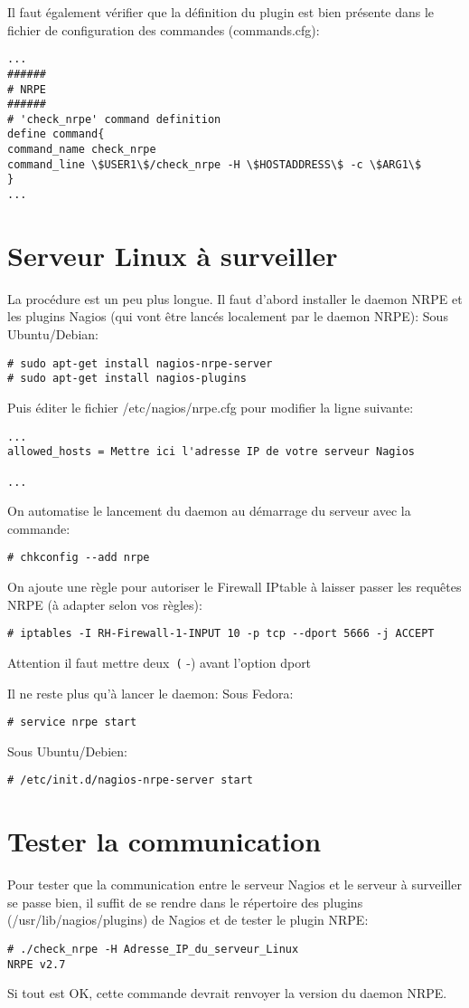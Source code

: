 Il faut également vérifier que la définition du plugin est bien présente dans le fichier de configuration des commandes (commands.cfg):
\begin{verbatim}
...
######
# NRPE
######
# 'check_nrpe' command definition
define command{
command_name check_nrpe
command_line \$USER1\$/check_nrpe -H \$HOSTADDRESS\$ -c \$ARG1\$
}
...
\end{verbatim}


\section {Serveur Linux à surveiller}

La procédure est un peu plus longue. Il faut d'abord installer le daemon NRPE et les plugins Nagios (qui vont être lancés localement par le daemon NRPE):
Sous Ubuntu/Debian:
\begin{verbatim}
# sudo apt-get install nagios-nrpe-server
# sudo apt-get install nagios-plugins
\end{verbatim}

Puis éditer le fichier /etc/nagios/nrpe.cfg pour modifier la ligne suivante:
\begin{verbatim}
...
allowed_hosts = Mettre ici l'adresse IP de votre serveur Nagios

...
\end{verbatim}

On automatise le lancement du daemon au démarrage du serveur avec la commande:
\begin{verbatim}
# chkconfig --add nrpe
\end{verbatim}

On ajoute une règle pour autoriser le Firewall IPtable à laisser passer les requêtes NRPE (à adapter selon vos règles):
\begin{verbatim}
# iptables -I RH-Firewall-1-INPUT 10 -p tcp --dport 5666 -j ACCEPT
\end{verbatim}

Attention il faut mettre deux{\verb - (- -)} avant l'option dport

Il ne reste plus qu'à lancer le daemon:
Sous Fedora:
\begin{verbatim}
# service nrpe start
\end{verbatim}
Sous Ubuntu/Debien:
\begin{verbatim}
# /etc/init.d/nagios-nrpe-server start
\end{verbatim}

\section {Tester la communication}
Pour tester que la communication entre le serveur Nagios et le serveur à surveiller se passe bien, il suffit de se rendre dans le répertoire des plugins (/usr/lib/nagios/plugins) de Nagios et de tester le plugin NRPE:
\begin{verbatim}
# ./check_nrpe -H Adresse_IP_du_serveur_Linux
NRPE v2.7
\end{verbatim}
Si tout est OK, cette commande devrait renvoyer la version du daemon NRPE.

